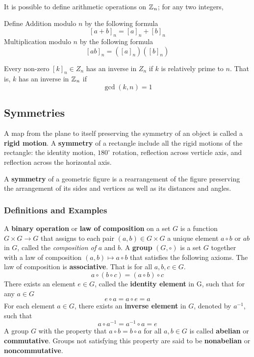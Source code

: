 \documentclass[11pt]{article} %
\begin{document}
{}

\newpage
It is possible to define arithmetic operations on $\text{$\mathbb{Z}^{}$}_n$; for any two integers, 
{Define
Addition modulo $n$ by the following formula 
$$[a + b]_n = [a]_n + [b]_n$$
Multiplication modulo $n$ by the following formula
$$[ab]_n = ([a]_n)([b]_n)$$

{Every non-zero $[k]_n \in Z_n$ has an inverse in $Z_n$ if $k$ is relatively prime to $n$. That is, $k$ has an inverse in $\text{$\mathbb{Z}^{}$}_n$ if
$$
\gcd(k, n) = 1
$$}
{}

}

\subsection{Symmetries}
A map from the plane to itself preserving the symmetry of an object is called a \textbf{rigid motion}. A \textbf{symmetry} of a rectangle include all the rigid motions of the rectangle: the identity motion, $180^\circ$ rotation, reflection across verticle axis, and reflection across the horizontal axis.

{A \textbf{symmetry} of a geometric figure is a rearrangement of the figure preserving the arrangement of its sides and vertices as well as its distances and angles.}

\newpage
\subsubsection{Definitions and Examples}
A \textbf{binary operation} or \textbf{law of composition} on a set $G$ is a function $G \times G \to G$ that assigns to each pair $(a, b) \in G \times G$ a unique element $a \circ b$ or $ab$ in $G$, called the \textit{composition of} $a$ and $b$. 
{A \textbf{group} $(G, \circ)$ is a set $G$ together with a law of composition $(a,b) \mapsto a \circ b$ that satisfies the following axioms.
\points
{The law of composition is \textbf{associative}. That is for all $a,b,c \in G$.
$$a \circ (b \circ c) = (a \circ b) \circ c$$}
{There exists an element $e \in G$, called the \textbf{ identity element} in G, such that for any $a \in G$
$$e \circ a = a \circ e = a$$}
{For each element $a \in G$, there exists an \textbf{inverse element} in $G$, denoted by $a^{-1}$, such that
$$a \circ a^{-1} = a^{-1} \circ a = e$$}
}
A group $G$ with the property that $a \circ b = b \circ a$ for all $a,b \in G$ is called \textbf{abelian} or \textbf{commutative}. Groups not satisfying this property are said to be \textbf{nonabelian} or \textbf{noncommutative}.
\end{document}
